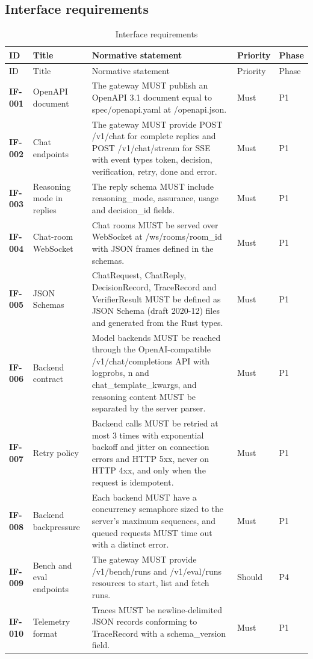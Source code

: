 \subsection{Interface requirements}
\begin{longtable}{@{}p{1.45cm}p{2.5cm}p{8.1cm}p{1.6cm}p{1.1cm}@{}}
\caption{Interface requirements}\\
\toprule ID & Title & Normative statement & Priority & Phase\\\midrule\endfirsthead
\toprule ID & Title & Normative statement & Priority & Phase\\\midrule\endhead
\bottomrule\endfoot
\textbf{IF-001} & OpenAPI document & The gateway MUST publish an OpenAPI 3.1 document equal to spec/openapi.yaml at /openapi.json. & Must & P1\\
\textbf{IF-002} & Chat endpoints & The gateway MUST provide POST /v1/chat for complete replies and POST /v1/chat/stream for SSE with event types token, decision, verification, retry, done and error. & Must & P1\\
\textbf{IF-003} & Reasoning mode in replies & The reply schema MUST include reasoning\_mode, assurance, usage and decision\_id fields. & Must & P1\\
\textbf{IF-004} & Chat-room WebSocket & Chat rooms MUST be served over WebSocket at /ws/rooms/{room\_id} with JSON frames defined in the schemas. & Must & P1\\
\textbf{IF-005} & JSON Schemas & ChatRequest, ChatReply, DecisionRecord, TraceRecord and VerifierResult MUST be defined as JSON Schema (draft 2020-12) files and generated from the Rust types. & Must & P1\\
\textbf{IF-006} & Backend contract & Model backends MUST be reached through the OpenAI-compatible /v1/chat/completions API with logprobs, n and chat\_template\_kwargs, and reasoning content MUST be separated by the server parser. & Must & P1\\
\textbf{IF-007} & Retry policy & Backend calls MUST be retried at most 3 times with exponential backoff and jitter on connection errors and HTTP 5xx, never on HTTP 4xx, and only when the request is idempotent. & Must & P1\\
\textbf{IF-008} & Backend backpressure & Each backend MUST have a concurrency semaphore sized to the server's maximum sequences, and queued requests MUST time out with a distinct error. & Must & P1\\
\textbf{IF-009} & Bench and eval endpoints & The gateway MUST provide /v1/bench/runs and /v1/eval/runs resources to start, list and fetch runs. & Should & P4\\
\textbf{IF-010} & Telemetry format & Traces MUST be newline-delimited JSON records conforming to TraceRecord with a schema\_version field. & Must & P1\\
\end{longtable}

